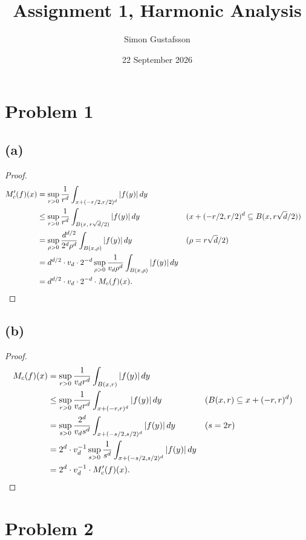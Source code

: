 \documentclass[12pt]{article}
\title{Assignment 1, Harmonic Analysis}
\author{Simon Gustafsson}
\date{22 September 2026}
\begin{document}
\maketitle

\section*{Problem 1}

\subsection*{(a)}

\begin{proof}
\begin{align*}
  M'_c(f)(x)
  &= \sup_{r>0}\frac{1}{r^d}\int_{x+(-r/2,r/2)^d}|f(y)|\,dy \\
  &\leq \sup_{r>0}\frac{1}{r^d}\int_{B(x,\,r\sqrt{d}/2)}|f(y)|\,dy
    &&\text{($x+(-r/2,r/2)^d \subseteq B(x,r\sqrt{d}/2)$)} \\
  &= \sup_{\rho>0}\frac{d^{d/2}}{2^d\rho^d}\int_{B(x,\rho)}|f(y)|\,dy
    &&\text{($\rho = r\sqrt{d}/2$)} \\
  &= d^{d/2}\cdot v_d\cdot 2^{-d} \sup_{\rho>0}\frac{1}{v_d\rho^d}\int_{B(x,\rho)}|f(y)|\,dy \\
  &= d^{d/2}\cdot v_d\cdot 2^{-d}\cdot M_c(f)(x). \qedhere
\end{align*}
\end{proof}

\subsection*{(b)}

\begin{proof}
\begin{align*}
  M_c(f)(x)
  &= \sup_{r>0}\frac{1}{v_d r^d}\int_{B(x,r)}|f(y)|\,dy \\
  &\leq \sup_{r>0}\frac{1}{v_d r^d}\int_{x+(-r,r)^d}|f(y)|\,dy
    &&\text{($B(x,r) \subseteq x+(-r,r)^d$)} \\
  &= \sup_{s>0}\frac{2^d}{v_d s^d}\int_{x+(-s/2,s/2)^d}|f(y)|\,dy
    &&\text{($s = 2r$)} \\
  &= 2^d\cdot v_d^{-1} \sup_{s>0}\frac{1}{s^d}\int_{x+(-s/2,s/2)^d}|f(y)|\,dy \\
  &= 2^d\cdot v_d^{-1}\cdot M'_c(f)(x). \qedhere
\end{align*}
\end{proof}

\section*{Problem 2}
\end{document}
